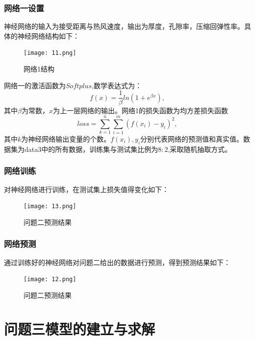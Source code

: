\documentclass[withoutpreface,bwprint]{cumcmthesis} %
\begin{document}
\subsubsection{网络一设置}
神经网络的输入为接受距离与热风速度，输出为厚度，孔隙率，压缩回弹性率。具体的神经网络结构如下：
   \begin{figure}[H]
	\centering
	\texttt{[image: 11.png]}	
	\caption{网络1结构}
	\label{11}
\end{figure}
网络一的激活函数为$Softplus$,数学表达式为：$$f(x)=\frac{1}{\beta}ln(1+e^{\beta x}),$$ 
其中$\beta$为常数，$x$为上一层网络的输出。网络1的损失函数为均方差损失函数$$loss=\sum_{k=1}^{n} \sum_{i=1}^m(f(x_i)-y_i)^2,$$其中$k$为神经网络输出变量的个数。$f(x_i),y_i$分别代表网络的预测值和真实值。数据集为data3中的所有数据，训练集与测试集比例为$8:2$,采取随机抽取方式。
\subsubsection{网络训练}
对神经网络进行训练，在测试集上损失值得变化如下：
   \begin{figure}[H]
	\centering
	\texttt{[image: 13.png]}	
	\caption{问题二预测结果}
	\label{11}
\end{figure}

\subsubsection{网络预测}
通过训练好的神经网络对问题二给出的数据进行预测，得到预测结果如下：
   \begin{figure}[H]
	\centering
	\texttt{[image: 12.png]}	
	\caption{问题二预测结果}
	\label{11}
\end{figure}


\section{问题三模型的建立与求解}
\end{document}
